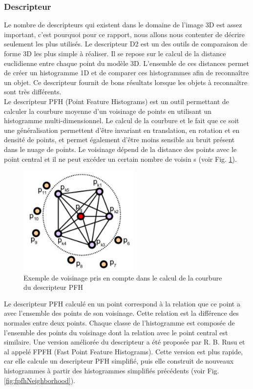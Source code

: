 \subsubsection{Descripteur}
\label{descriptor}
Le nombre de descripteurs qui existent dans le domaine de l'image 3D est assez important, c'est pourquoi pour ce rapport,
nous allons nous contenter de décrire seulement les plus utilisés. Le descripteur D2\cite{D2} est un des outils de 
comparaison de forme 3D les plus simple à réaliser. Il se repose sur le calcul de la distance euclidienne entre 
chaque point du modèle 3D. L'ensemble de ces distances permet de créer un histogramme 1D et de comparer ces histogrammes
afin de reconnaître un objet. Ce descripteur fournit de bons résultats lorsque les objets à reconnaître sont très 
différents.\\

Le descripteur PFH\cite{PFH} (Point Feature Histograms) est un outil permettant de calculer la courbure moyenne d'un voisinage de points en utilisant un histogramme multi-dimensionnel. Le calcul de la courbure et le fait que ce soit une généralisation permettent d'être invariant 
en translation, en rotation et en densité de points, et permet également d'être moins sensible au bruit présent dans le nuage de points. Le voisinage 
dépend de la distance des points avec le point central et il ne peut excéder un certain nombre de voisin s
(voir Fig. \ref{fig:pfhNeighborhood}).\\

\begin{figure}[!ht]
  \begin{center}
    \includegraphics[width=6cm]{image/PFH.png}
    \caption{Exemple de voisinage pris en compte dans le calcul de la courbure du descripteur PFH}
    \label{fig:pfhNeighborhood}
  \end{center}
\end{figure}

Le descripteur PFH calculé en un point correspond à la relation que ce point a avec l'ensemble des points de son voisinage. Cette relation
est la différence des normales entre deux points. Chaque classe de l'histogramme est composée de l'ensemble des points du voisinage dont 
la relation avec le point central est similaire. Une version améliorée du descripteur a été proposée par R. B. Rusu et al\cite{FPFH} appelé
FPFH (Fast Point Feature Histograms). Cette version est plus rapide, car elle calcule un descripteur PFH simplifié, puis elle construit
de nouveaux histogrammes à partir des histogrammes simplifiés précédents (voir Fig. \ref{fig:fpfhNeighborhood}).\\

